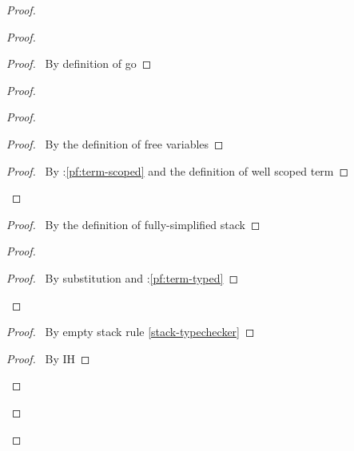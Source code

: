\documentclass[a4paper]{article}
\begin{document}
\begin{proof}
  \begin{proof}
    \begin{proof}
      \pf\ By definition of \textsf{go}
    \end{proof}
    \begin{proof}
      \begin{proof}
        \begin{proof}
          \pf\ By the definition of free variables
        \end{proof}
        \qedstep
        \begin{proof}
          \pf\ By \toplevel:\ref{pf:term-scoped} and the definition of well scoped term
        \end{proof}
      \end{proof}
      \begin{proof}
        \pf\ By the definition of fully-simplified stack
      \end{proof}
      \begin{proof}
        \begin{proof}
          \pf\ By substitution and \toplevel:\ref{pf:term-typed}
        \end{proof}
      \end{proof}
      \begin{proof}
        \pf\ By empty stack rule \ref{stack-typechecker}
      \end{proof}
      \qedstep
      \begin{proof}
        \pf\ By IH
      \end{proof}
    \end{proof}

\end{proof}
\end{proof}
\end{document}
